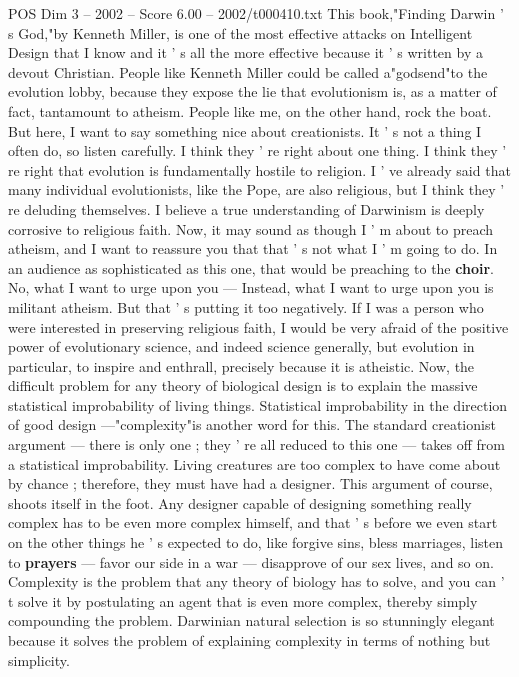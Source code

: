 \begin{textsample}{POS Dim 3 – 2002 – Score 6.00 – 2002/t000410.txt}
This book,"Finding Darwin ' s God,"by Kenneth Miller, is one of the most effective attacks on Intelligent Design that I know and it ' s all the more effective because it ' s written by a devout Christian.
People like Kenneth Miller could be called a"godsend"to the evolution lobby, because they expose the lie that evolutionism is, as a matter of fact, tantamount to atheism.
People like me, on the other hand, rock the boat.
But here, I want to say something nice about creationists.
It ' s not a thing I often do, so listen carefully.
I think they ' re right about one thing.
I think they ' re right that evolution is fundamentally hostile to religion.
I ' ve already said that many individual evolutionists, like the Pope, are also religious, but I think they ' re deluding themselves.
I believe a true understanding of Darwinism is deeply corrosive to religious faith.
Now, it may sound as though I ' m about to preach atheism, and I want to reassure you that that ' s not what I ' m going to do.
In an audience as sophisticated as this one, that would be preaching to the \textbf{choir}.
No, what I want to urge upon you — Instead, what I want to urge upon you is militant atheism.
But that ' s putting it too negatively.
If I was a person who were interested in preserving religious faith, I would be very afraid of the positive power of evolutionary science, and indeed science generally, but evolution in particular, to inspire and enthrall, precisely because it is atheistic.
Now, the difficult problem for any theory of biological design is to explain the massive statistical improbability of living things.
Statistical improbability in the direction of good design —"complexity"is another word for this.
The standard creationist argument — there is only one ; they ' re all reduced to this one — takes off from a statistical improbability.
Living creatures are too complex to have come about by chance ; therefore, they must have had a designer.
This argument of course, shoots itself in the foot.
Any designer capable of designing something really complex has to be even more complex himself, and that ' s before we even start on the other things he ' s expected to do, like forgive sins, bless marriages, listen to \textbf{prayers} — favor our side in a war — disapprove of our sex lives, and so on.
Complexity is the problem that any theory of biology has to solve, and you can ' t solve it by postulating an agent that is even more complex, thereby simply compounding the problem.
Darwinian natural selection is so stunningly elegant because it solves the problem of explaining complexity in terms of nothing but simplicity.

\end{textsample}
